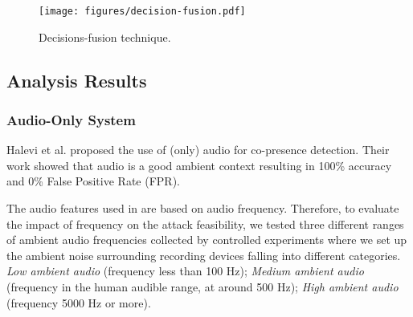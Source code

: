 {\begin{figure}[htpb] 
	\centering
	\texttt{[image: figures/decision-fusion.pdf]}
	\caption{Decisions-fusion technique.}
	\label{fig:decision-fusion}
\end{figure} 

} 

\begin{comment}
We consider two methods to aggregate decisions. The first method is based on a simple
majority voting
(hereafter referred to as \emph{equal voting})
 which takes binary decisions from all sensors with equal
weights. The second method 
is a novel variant, we call \emph{weighted voting}, which
fuses decisions with different weights assigned to
each sensor. We start with a list of sensors, $S_1, S_2, ..., S_n$, sorted by the order
of attack resilience according to the single modality attack, the weight assigned
to $S_i$ is computed as: $1/N * i$, where $N = \frac{n * (n+1)}{2}$, $i$ is the
position of $S_i$ in the sorted list. As an example, the decisions-fusion weighted voting for Audio-Radio is done as follows. Sensors \audio, \bluetooth, \wifi have performance: 3\%,
2.7\%, 99.8\% (Table \ref{tbl:all-mani}), respectively. The sorted
list is therefore [\wifi, \audio, \bluetooth]. When these sensors are fused, their weights will
be assigned as: 1/6 for \wifi, 2/6 for \audio and 3/6 for \bluetooth. Note that
in equal voting, the weight of each sensor is 1/3. 
When more sensors are fused, weights will be adapted with similar scheme.
}

\end{comment}








\subsection{Analysis Results}

\subsubsection{Audio-Only System}
\label{sec:audio-only}
Halevi et al. \cite{DBLP:conf/esorics/HaleviMSX12} proposed the use of (only) audio
for co-presence detection. Their work showed that audio is a good ambient
context resulting in 100\% accuracy and 0\% False Positive Rate (FPR).

The audio features used in \cite{DBLP:conf/esorics/HaleviMSX12} are based on
audio frequency. Therefore, to evaluate the impact of frequency on the attack
feasibility, we tested three different ranges of ambient audio frequencies
collected by controlled experiments where we set up the ambient noise
surrounding recording devices falling into different categories. \textit{Low
ambient audio} (frequency less than 100 Hz); \textit{Medium ambient audio}
(frequency in the human audible range, at around 500 Hz); \textit{High ambient
audio} (frequency 5000 Hz or more).


